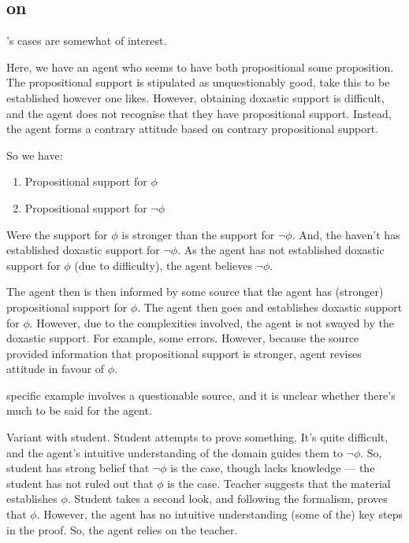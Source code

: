 \subsection{\citeauthor{Audi:1983ux} on \citeauthor{Lehrer:1971aa}}
\label{sec:lehrer}

\begin{note}[Lehrer]
  \citeauthor{Lehrer:1971aa}'s cases are somewhat of interest.

  Here, we have an agent who seems to have both propositional some proposition.
  The propositional support is stipulated as unquestionably good, take this to be established however one likes.
  However, obtaining doxastic support is difficult, and the agent does not recognise that they have propositional support.
  Instead, the agent forms a contrary attitude based on contrary propositional support.

  So we have:
  \begin{enumerate}
  \item\label{L:gl:prop:p} Propositional support for \(\phi\)
  \item\label{L:gl:prop:not-p} Propositional support for \(\lnot\phi\)
  \end{enumerate}
  Were the support for \(\phi\) is stronger than the support for \(\lnot\phi\).
  And, the haven't has established doxastic support for \(\lnot\phi\).
  As the agent has not established doxastic support for \(\phi\) (due to difficulty), the agent believes \(\lnot\phi\).

  The agent then is then informed by some source that the agent has (stronger) propositional support for \(\phi\).
  The agent then goes and establishes doxastic support for \(\phi\).
  However, due to the complexities involved, the agent is not swayed by the doxastic support.
  For example, some errors.
  However, because the source provided information that propositional support is stronger, agent revises attitude in favour of \(\phi\).
\end{note}

\begin{note}[Example]
  \citeauthor{Lehrer:1971aa} specific example involves a questionable source, and it is unclear whether there's much to be said for the agent.

  Variant with student.
  Student attempts to prove something.
  It's quite difficult, and the agent's intuitive understanding of the domain guides them to \(\lnot\phi\).
  So, student has strong belief that \(\lnot\phi\) is the case, though lacks knowledge --- the student has not ruled out that \(\phi\) is the case.
  Teacher suggests that the material establishes \(\phi\).
  Student takes a second look, and following the formalism, proves that \(\phi\).
  However, the agent has no intuitive understanding (some of the) key steps in the proof.
  So, the agent relies on the teacher.
\end{note}

